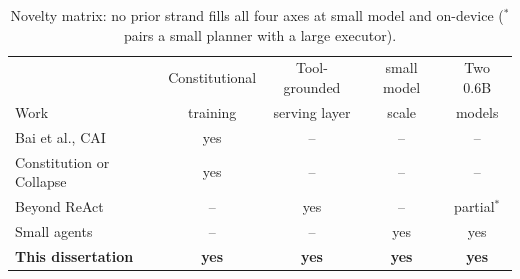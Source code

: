 \begin{table}[t]
  \centering
  \caption{Novelty matrix: no prior strand fills all four axes at small model and on-device (${}^{*}$ pairs a small planner with a large executor).}
  \label{tab:novelty}
  \begin{tabular}{lcccc}
    \hline
     & Constitutional & Tool-grounded & small model & Two 0.6B \\
    Work & training & serving layer & scale & models \\
    \hline
    Bai et al., CAI \cite{bai2022constitutionalaiharmlessnessai} & yes & -- & -- & -- \\
    Constitution or Collapse \cite{zhang2025constitutioncollapseexploringconstitutional} & yes & -- & -- & -- \\
    Beyond ReAct \cite{wei2025reactplannercentricframeworkcomplex} & -- & yes & -- & partial${}^{*}$ \\
    Small agents \cite{zywot2026smallagentscollaboratebeat} & -- & -- & yes & yes \\
    \textbf{This dissertation} & \textbf{yes} & \textbf{yes} & \textbf{yes} & \textbf{yes} \\
    \hline
  \end{tabular}
\end{table}

%

